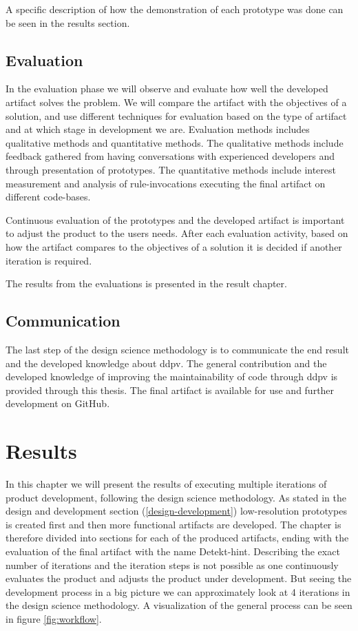 \documentclass{report}
\begin{document}
A specific description of how the demonstration of each prototype was done can be seen in the results section.

 
\section{Evaluation}
In the evaluation phase we will observe and evaluate how well the developed artifact solves the problem. We will compare the artifact with the objectives of a solution, and use different techniques for evaluation based on the type of artifact and at which stage in development we are. Evaluation methods includes qualitative methods and quantitative methods. The qualitative methods include feedback gathered from having conversations with experienced developers and through presentation of prototypes. The quantitative methods include interest measurement and analysis of rule-invocations executing the final artifact on different code-bases.  

Continuous evaluation of the prototypes and the developed artifact is important to adjust the product to the users needs. After each evaluation activity, based on how the artifact compares to the objectives of a solution it is decided if another iteration is required.

The results from the evaluations is presented in the result chapter.

\section{Communication}
The last step of the design science methodology is to communicate the end result and the developed knowledge about \gls{ddpv}. The general contribution and the developed knowledge of improving the maintainability of code through \gls{ddpv} is provided through this thesis. The final artifact is available for use and further development on GitHub\cite{detekt-hint-repository}.

\chapter{Results}
\label{results}

In this chapter we will present the results of executing multiple iterations of product development, following the design science methodology. As stated in the design and development section (\ref{design-development}) low-resolution 
prototypes is created first and then more functional artifacts are developed. The chapter is therefore divided into sections for each of the produced artifacts, ending with the evaluation of the final artifact with the name Detekt-hint. Describing the exact number of iterations and the iteration steps is not possible as one continuously evaluates the product and adjusts the product under development. But seeing the development process in a big picture we can approximately look at 4 iterations in the design science methodology. A visualization of the general process can be seen in figure \ref{fig:workflow}.
\end{document}
